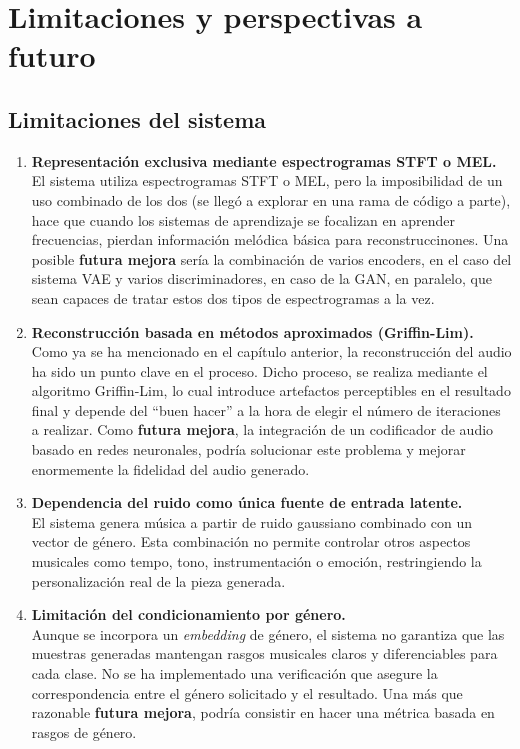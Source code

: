 \chapter{Limitaciones y perspectivas a futuro}
\section{Limitaciones del sistema}
\begin{enumerate}
    \item \textbf{Representación exclusiva mediante espectrogramas STFT o MEL.} \\
    El sistema utiliza espectrogramas STFT o MEL, pero la imposibilidad de un uso combinado de los dos (se llegó a explorar en una rama de código a parte), hace que cuando los sistemas de aprendizaje se focalizan en aprender frecuencias, pierdan información melódica básica para reconstruccinones. Una posible \textbf{futura mejora} sería la combinación de varios encoders, en el caso del sistema VAE y varios discriminadores, en caso de la GAN, en paralelo, que sean capaces de tratar estos dos tipos de espectrogramas a la vez.

    \item \textbf{Reconstrucción basada en métodos aproximados (Griffin-Lim).} \\
    Como ya se ha mencionado en el capítulo anterior, la reconstrucción del audio ha sido un punto clave en el proceso. Dicho proceso, se realiza mediante el algoritmo Griffin-Lim, lo cual introduce artefactos perceptibles en el resultado final y depende del ``buen hacer'' a la hora de elegir el número de iteraciones a realizar. Como \textbf{futura mejora}, la integración de un codificador de audio basado en redes neuronales, podría solucionar este problema y mejorar enormemente la fidelidad del audio generado.

    \item \textbf{Dependencia del ruido como única fuente de entrada latente.} \\
    El sistema genera música a partir de ruido gaussiano combinado con un vector de género. Esta combinación no permite controlar otros aspectos musicales como tempo, tono, instrumentación o emoción, restringiendo la personalización real de la pieza generada.

    \item \textbf{Limitación del condicionamiento por género.} \\
    Aunque se incorpora un \textit{embedding} de género, el sistema no garantiza que las muestras generadas mantengan rasgos musicales claros y diferenciables para cada clase. No se ha implementado una verificación que asegure la correspondencia entre el género solicitado y el resultado. Una más que razonable \textbf{futura mejora}, podría consistir en hacer una métrica basada en rasgos de género.


\end{enumerate}
